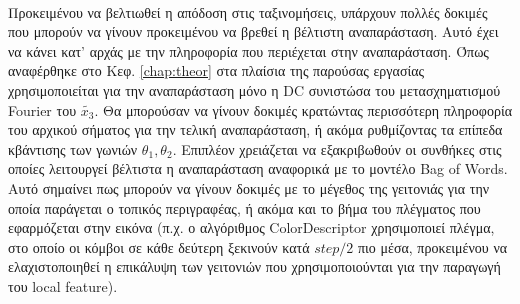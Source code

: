 \paragraph*{}
Προκειμένου να βελτιωθεί η απόδοση στις ταξινομήσεις, υπάρχουν πολλές δοκιμές που μπορούν να γίνουν προκειμένου να βρεθεί η βέλτιστη αναπαράσταση. Αυτό έχει να κάνει κατ' αρχάς με την πληροφορία που περιέχεται στην αναπαράσταση. Όπως αναφέρθηκε στο Κεφ. \ref{chap:theor} στα πλαίσια της παρούσας εργασίας χρησιμοποιείται για την αναπαράσταση μόνο η DC συνιστώσα του μετασχηματισμού Fourier του $\tilde{x_3}$. Θα μπορούσαν να γίνουν δοκιμές κρατώντας περισσότερη πληροφορία του αρχικού σήματος για την τελική αναπαράσταση, ή ακόμα ρυθμίζοντας τα επίπεδα κβάντισης των γωνιών $\theta_1, \theta_2$. Επιπλέον χρειάζεται να εξακριβωθούν οι συνθήκες στις οποίες λειτουργεί βέλτιστα η αναπαράσταση αναφορικά με το μοντέλο Bag of Words. Αυτό σημαίνει πως μπορούν να γίνουν δοκιμές με το μέγεθος της γειτονιάς για την οποία παράγεται ο τοπικός περιγραφέας, ή ακόμα και το βήμα του πλέγματος που εφαρμόζεται στην εικόνα (π.χ. ο αλγόριθμος ColorDescriptor χρησιμοποιεί πλέγμα, στο οποίο οι κόμβοι σε κάθε δεύτερη ξεκινούν κατά $step/2$ πιο μέσα, προκειμένου να ελαχιστοποιηθεί η επικάλυψη των γειτονιών που χρησιμοποιούνται για την παραγωγή του local feature).
